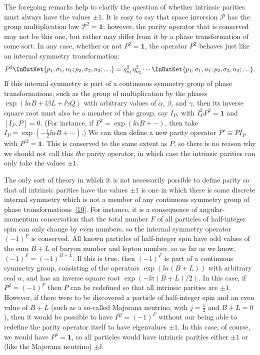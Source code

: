 The foregoing remarks help to clarify the question of whether intrinsic parities
must always have the values $\pm1$. It is easy to say that space inversion
$\mathcal{P}$ has the group multiplication law $\mathcal{P}^2=\mathbf{1}$; however,
the parity operator that is conserved may not be this one, but rather may differ
from it by a phase transformation of some sort. In any case, whether or not
$P^2=\mathbf{1}$, the operator $P^2$ behaves just like an internal symmetry
transformation:
\[
P^2\InOutKet{p_1,\sigma_1,n_1;p_2,\sigma_2,n_2;\ldots}
=\eta_{n_1}^2\eta_{n_2}^2\cdots
\InOutKet{p_1,\sigma_1,n_1;p_2,\sigma_2,n_2;\ldots}.
\]
If this internal symmetry is part of a continuous symmetry group of phase
transformations, such as the group of multiplication by the phases
$\exp(\ii\alpha B+\ii\beta L+\ii\gamma Q)$ with arbitrary values of $\alpha$, $\beta$,
and $\gamma$, then its inverse square root must also be a member of this group, say
$I_P$, with $I_P^2P^2=\mathbf{1}$ and $[I_P,P]=0$. (For instance, if
$P^2=\exp(\ii\alpha B+\cdots)$, then take
$I_P=\exp(-\tfrac12\ii\alpha B+\cdots)$.) We can then define a new parity operator
$P'\equiv PI_P$ with $P^{\prime2}=\mathbf{1}$. This is conserved to the same extent
as $P$, so there is no reason why we should not call this \textit{the} parity
operator, in which case the intrinsic parities can only take the values $\pm1$.

The only sort of theory in which it is not necessarily possible to define parity so
that all intrinsic parities have the values $\pm1$ is one in which there is some
discrete internal symmetry which is not a member of any continuous symmetry group
of phase transformations~\hyperref[ref:3.10]{[10]}. For instance, it is a consequence of
angular-momentum conservation that the total number $F$ of all particles of
half-integer spin can only change by even numbers, so the internal symmetry operator
$(-1)^F$ is conserved. All known particles of half-integer spin have odd values of
the sum $B+L$ of baryon number and lepton number, so as far as we know,
$(-1)^F=(-1)^{B+L}$. If this is true, then $(-1)^F$ is part of a continuous symmetry
group, consisting of the operators $\exp(\ii\alpha(B+L))$ with arbitrary real
$\alpha$, and has an inverse square root $\exp(-\ii\pi(B+L)/2)$. In this case, if
$P^2=(-1)^F$ then $P$ can be redefined so that all intrinsic parities are $\pm1$.
However, if there were to be discovered a particle of half-integer spin and an even
value of $B+L$ (such as a so-called Majorana neutrino, with $j=\tfrac12$ and
$B+L=0$), then it would be possible to have $P^2=(-1)^F$ without our being able to
redefine the parity operator itself to have eigenvalues $\pm1$. In this case, of
course, we would have $P^4=\mathbf{1}$, so all particles would have intrinsic
parities either $\pm1$ or (like the Majorana neutrino) $\pm \ii$.

